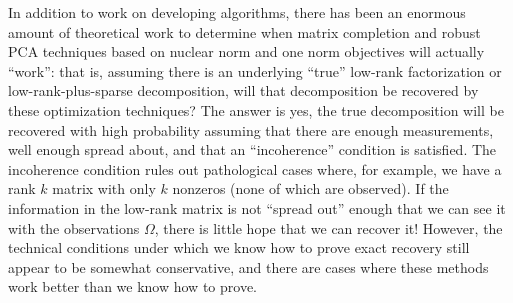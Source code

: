\documentclass[12pt, leqno]{article} %
\begin{document}
In addition to work on developing algorithms, there has been an
enormous amount of theoretical work to determine when matrix
completion and robust PCA techniques based on nuclear norm and one
norm objectives will actually ``work'': that is, assuming there is an
underlying ``true'' low-rank factorization or low-rank-plus-sparse
decomposition, will that decomposition be recovered by these
optimization techniques?  The answer is yes, the true decomposition
will be recovered with high probability assuming that there are enough
measurements, well enough spread about, and that an ``incoherence''
condition is satisfied.  The incoherence condition rules out
pathological cases where, for example, we have a rank $k$ matrix with
only $k$ nonzeros (none of which are observed).  If the information in
the low-rank matrix is not ``spread out'' enough that we can see it
with the observations $\Omega$, there is little hope that we can
recover it!  However, the technical conditions under which we know how to
prove exact recovery still appear to be somewhat conservative, and
there are cases where these methods work better than we know how to
prove.
\end{document}
